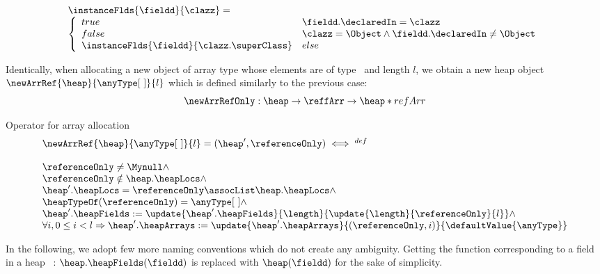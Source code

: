 $$
 \begin{array}{l}
       \instanceFlds{\fieldd}{\clazz } = \\
       \left\{\begin{array}{ll}
                    true  & \fieldd.\declaredIn = \clazz \\
		    false & \clazz = \Object \wedge \fieldd.\declaredIn \neq \Object \\
		    \instanceFlds{\fieldd}{\clazz.\superClass} & else
       \end{array}\right.
 \end{array}
$$


Identically, when allocating a new object of array type whose elements are of type \anyType \ and length $l$, we obtain 
a new heap object  $\newArrRef{\heap}{\anyType \lbrack \ \rbrack  }{l} $ which is defined similarly to the previous case: 
$$ \newArrRefOnly :  \heap \rightarrow  \reffArr \rightarrow  \heap * refArr $$
\begin{heapDef}{Operator for array allocation}\label{heap:arrAlloc}
 $$  \begin{array}{l}
            \newArrRef{\heap}{\anyType\lbrack \ \rbrack}{l} = (\heap', \referenceOnly)      \iff^{def} \\
	    \\
	    \referenceOnly \neq \Mynull \wedge \\ 
	    \referenceOnly \notin \heap.\heapLocs \wedge   \\ 
	    \heap'.\heapLocs = \referenceOnly \assocList \heap.\heapLocs \wedge \\ 
	    \heapTypeOf( \referenceOnly ) = \anyType\lbrack \ \rbrack  \wedge \\ 
            \heap'.\heapFields :=  \update{\heap'.\heapFields}{\length}{\update{\length}{ \referenceOnly}{ l }} \wedge  \\
	    \forall i, 0 \le i < l  \Rightarrow   \heap'.\heapArrays :=
            \update{\heap'.\heapArrays}{(\referenceOnly , i)}{ \defaultValue{\anyType }  } \\
	     
     \end{array} $$
\end{heapDef}


In the following, we adopt few more naming conventions which do not create any ambiguity.
 Getting the function corresponding to a field \fieldd{} in a heap \heap \ :
$ \heap . \heapFields ( \fieldd)$ is replaced  with $ \heap  ( \fieldd)$ for the sake of simplicity.
 
